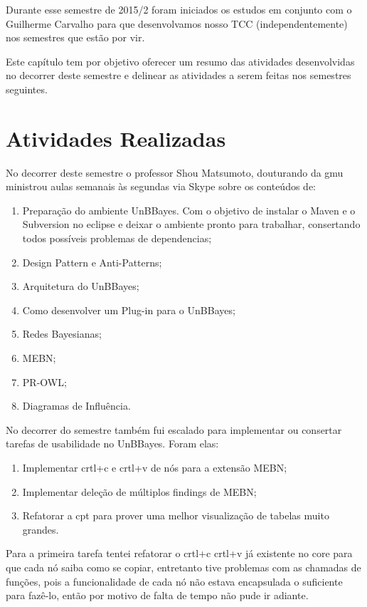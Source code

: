 Durante esse semestre de 2015/2 foram iniciados os estudos em conjunto com o Guilherme Carvalho para que desenvolvamos nosso TCC (independentemente) nos semestres que estão por vir.

Este capítulo tem por objetivo oferecer um resumo das atividades desenvolvidas no decorrer deste semestre e delinear as atividades a serem feitas nos semestres seguintes. 

\section{Atividades Realizadas}
No decorrer deste semestre o professor Shou Matsumoto, douturando da \gls{gmu} ministrou aulas semanais às segundas via Skype sobre os conteúdos de: 

\begin{enumerate}
	\item Preparação do ambiente UnBBayes. Com o objetivo de instalar o Maven e o Subversion no eclipse e deixar o ambiente pronto para trabalhar, consertando todos possíveis problemas de dependencias;
	\item Design Pattern e Anti-Patterns;
	\item Arquitetura do UnBBayes;
	\item Como desenvolver um Plug-in para o UnBBayes;
	\item Redes Bayesianas;
	\item MEBN;
	\item PR-OWL;
	\item Diagramas de Influência.
\end{enumerate}

No decorrer do semestre também fui escalado para implementar ou consertar tarefas de usabilidade no UnBBayes. Foram elas:
\begin{enumerate}
	\item Implementar crtl+c e crtl+v de nós para a extensão MEBN;
	\item Implementar deleção de múltiplos findings de MEBN;
	\item Refatorar a \gls{cpt} para prover uma melhor visualização de tabelas muito grandes.
\end{enumerate}

Para a primeira tarefa tentei refatorar o crtl+c crtl+v já existente no core para que cada nó saiba como se copiar, entretanto tive problemas com as chamadas de funções, pois a funcionalidade de cada nó não estava encapsulada o suficiente para fazê-lo, então por motivo de falta de tempo não pude ir adiante.

